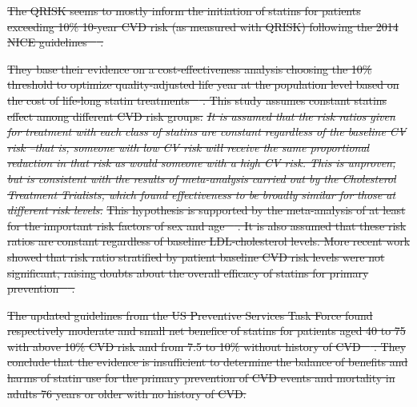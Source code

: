 \documentclass[10pt,letterpaper]{article}
\providecommand{\DIFdeltex}[1]{{\protect\color{red}\sout{#1}}}                      %
\providecommand{\DIFdelbegin}{} %
\providecommand{\DIFdelend}{} %
\providecommand{\DIFdel}[1]{\texorpdfstring{\DIFdeltex{#1}}{}} %
\newcommand{\DIFscaledelfig}{0.5}
\newlength{\DIFdelgraphicswidth} %
\newlength{\DIFdelgraphicsheight} %
\newcommand{\DIFdelincludegraphics}[2][]{%
\sbox{\DIFdelgraphicsbox}{\DIFOincludegraphics[#1]{#2}}%
\settoboxwidth{\DIFdelgraphicswidth}{\DIFdelgraphicsbox} %
\settoboxtotalheight{\DIFdelgraphicsheight}{\DIFdelgraphicsbox} %
\scalebox{\DIFscaledelfig}{%
\parbox[b]{\DIFdelgraphicswidth}{\usebox{\DIFdelgraphicsbox}\\[-\baselineskip] \rule{\DIFdelgraphicswidth}{0em}}\llap{\resizebox{\DIFdelgraphicswidth}{\DIFdelgraphicsheight}{%
\setlength{\unitlength}{\DIFdelgraphicswidth}%
\begin{picture}(1,1)%
\thicklines\linethickness{2pt} %
{\color[rgb]{1,0,0}\put(0,0){\framebox(1,1){}}}%
{\color[rgb]{1,0,0}\put(0,0){\line( 1,1){1}}}%
{\color[rgb]{1,0,0}\put(0,1){\line(1,-1){1}}}%
\end{picture}%
}\hspace*{3pt}}} %
} %
\DeclareRobustCommand{\DIFdelbegin}{\DIFOdelbegin \let\includegraphics\DIFdelincludegraphics} %
\DeclareRobustCommand{\DIFdelend}{\DIFOaddend \let\includegraphics\DIFOincludegraphics} %
\begin{document}
\DIFdelbegin \DIFdel{The QRISK seems to mostly inform the initiation of statins for patients
exceeding 10\% 10-year CVD risk (as measured with QRISK) following the 2014
NICE guidelines \mbox{%
\cite{rabar2014lipid}}\hskip0pt%
.
}\DIFdelend %

\DIFdelbegin \DIFdel{They base their evidence on a cost-effectiveness analysis choosing the 10\%
threshold to optimize quality-adjusted life year at the population level based
on the cost of life-long statin treatments \mbox{%
\cite{guthrie2023competing}}\hskip0pt%
. This
study assumes constant statins effect among different CVD risk groups:
}\emph{\DIFdel{It is assumed that the risk ratios given for treatment with each class
  of statins are constant regardless of the baseline CV risk --that is, someone
  with low CV risk will receive the same proportional reduction in that risk as
  would someone with a high CV risk. This is unproven, but is consistent with
  the results of meta-analysis carried out by the Cholesterol Treatment
  Trialists, which found effectiveness to be broadly similar for those at
  different risk levels.}} %
\DIFdel{This hypothesis is supported by the meta-analysis of
at least for the important risk factors of sex and age \mbox{%
\cite{brugts2009benefits}}\hskip0pt%
. It is also assumed that these risk ratios are constant regardless of
baseline LDL-cholesterol levels. More recent work showed that risk ratio
stratified by patient baseline CVD risk levels were not significant, raising
doubts about the overall efficacy of statins for primary prevention \mbox{%
\cite{byrne2019statins}}\hskip0pt%
.
}\DIFdelend %

\DIFdelbegin \DIFdel{The updated guidelines from the US Preventive Services Task Force found
respectively moderate and small net benefice of statins for patients aged 40
to 75 with above 10\% CVD risk and from 7.5 to 10\% without history of CVD
\mbox{%
\cite{chou2022statin}}\hskip0pt%
. They conclude that the evidence is insufficient to
determine the balance of benefits and harms of statin use for the primary
prevention of CVD events and mortality in adults 76 years or older with no
history of CVD.
}\DIFdelend %
\end{document}
